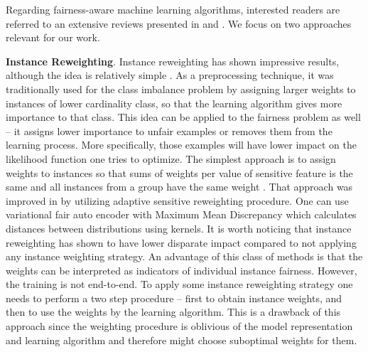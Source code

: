\documentclass[preprint,12pt]{elsarticle}
\begin{document}
Regarding fairness-aware machine learning algorithms, interested readers are referred to an extensive reviews presented in \cite{friedler2019comparative} and \cite{corbett2018measure}. We focus on two approaches relevant for our work.

\textbf{Instance Reweighting}. Instance reweighting has shown impressive results, although the idea is relatively simple \cite{feldman2015certifying, krasanakis2018adaptive, ren2018learning, shu2019meta, jiang2018mentornet}. As a preprocessing technique, it was traditionally used for the class imbalance problem by assigning larger weights to instances of lower cardinality class, so that the learning algorithm gives more importance to that class. This idea can be applied to the fairness problem as well -- it assigns lower importance to unfair examples or removes them from the learning process. More specifically, those examples will have lower impact on the likelihood function one tries to optimize.
The simplest approach is to assign weights to instances so that sums of weights per value of sensitive feature is the same and all instances from a group have the same weight \cite{kamiran2012data}. That approach was improved in \cite{krasanakis2018adaptive} by utilizing adaptive sensitive reweighting procedure. One can use variational fair auto encoder with Maximum Mean Discrepancy \cite{louizos2015variational} which calculates distances between distributions using kernels. It is worth noticing that instance reweighting has shown to have lower disparate impact \cite{feldman2015certifying} compared to not applying any instance weighting strategy. An advantage of this class of methods is that the weights can be interpreted as indicators of individual instance fairness. However, the training is not end-to-end. To apply some instance reweighting strategy one needs to perform a two step procedure -- first to obtain instance weights, and then to use the weights by the learning algorithm. This is a drawback of this approach since the weighting procedure is oblivious of the model representation and learning algorithm and therefore might choose suboptimal weights for them.
\end{document}
